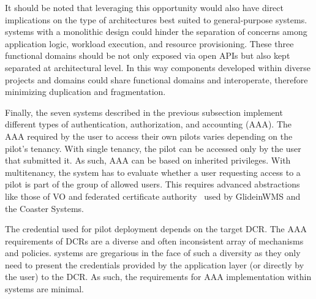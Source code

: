 \documentclass{sig-alternate}
\begin{document}
It should be noted that leveraging this opportunity would also have direct
implications on the type of architectures best suited to general-purpose \pilot
systems. \pilot systems with a monolithic design could hinder the separation of
concerns among application logic, workload execution, and resource provisioning.
These three functional domains should be not only exposed via open APIs but also
kept separated at architectural level. In this way components developed within
diverse projects and domains could share functional domains and interoperate,
therefore minimizing duplication and fragmentation.

 

Finally, the seven \pilot systems described in the previous subsection implement
different types of authentication, authorization, and accounting (AAA).  The AAA
required by the user to access their own pilots varies depending on the pilot's
tenancy. With single tenancy, the pilot can be accessed only by the user that
submitted it. As such, AAA can be based on inherited privileges. With
multitenancy, the \pilot system has to evaluate whether a user requesting access
to a pilot is part of the group of allowed users. This requires advanced
abstractions like those of VO and federated certificate
authority~\cite{horwitz2002} used by GlideinWMS and the Coaster Systems.

The credential used for pilot deployment depends on the target DCR. The AAA
requirements of DCRs are a diverse and often inconsistent array of mechanisms
and policies. \pilot systems are gregarious in the face of such a diversity as
they only need to present the credentials provided by the application layer (or
directly by the user) to the DCR. As such, the requirements for AAA
implementation within \pilot systems are minimal.

 


%
\end{document}
